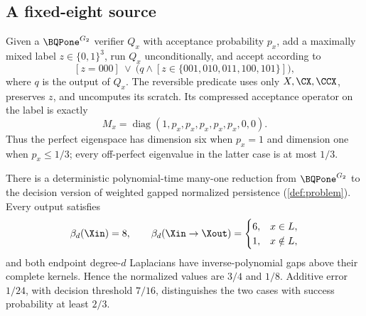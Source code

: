 \subsection{A fixed-eight source}

Given a \(\BQPone^{G_2}\) verifier \(Q_x\) with acceptance probability \(p_x\),
add a maximally mixed label \(z\in\{0,1\}^3\), run \(Q_x\) unconditionally,
and accept according to
\[
[z=000]\ \lor\
\bigl(q\land[z\in\{001,010,011,100,101\}]\bigr),
\]
where \(q\) is the output of \(Q_x\).  The reversible predicate uses only
\(X,\CX,\CCX\), preserves \(z\), and uncomputes its scratch.  Its compressed
acceptance operator on the label is exactly
\begin{equation}
\label{eq:eight-label}
M_x=\operatorname{diag}(1,p_x,p_x,p_x,p_x,p_x,0,0).
\end{equation}
Thus the perfect eigenspace has dimension six when \(p_x=1\) and dimension
one when \(p_x\le1/3\); every off-perfect eigenvalue in the latter case is at
most \(1/3\).

\begin{theorem}
\label{thm:weighted-hardness}
There is a deterministic polynomial-time many-one reduction from
\(\BQPone^{G_2}\) to the decision version of weighted gapped normalized
persistence (\cref{def:problem}).  Every output
satisfies
\[
\beta_d(\Xin)=8,\qquad
\beta_d(\Xin\to\Xout)=
\begin{cases}6,&x\in L,\\1,&x\notin L,\end{cases}
\]
and both endpoint degree-\(d\) Laplacians have inverse-polynomial gaps above
their complete kernels.  Hence the normalized values are \(3/4\) and \(1/8\).
Additive error \(1/24\), with decision threshold \(7/16\), distinguishes the
two cases with success probability at least \(2/3\).
\end{theorem}

